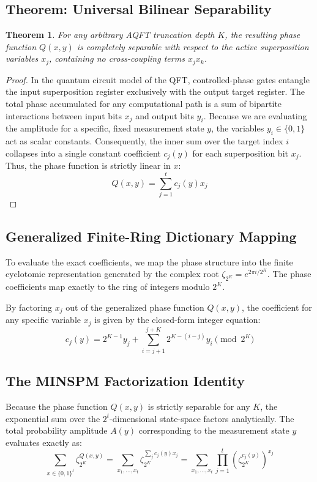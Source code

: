 \documentclass[11pt, a4paper]{article}
\newtheorem{theorem}{Theorem}
\begin{document}
\subsection{Theorem: Universal Bilinear Separability}
\begin{theorem}
For any arbitrary AQFT truncation depth $K$, the resulting phase function $Q(x,y)$ is completely separable with respect to the active superposition variables $x_j$, containing no cross-coupling terms $x_j x_k$.
\end{theorem}

\begin{proof}
In the quantum circuit model of the QFT, controlled-phase gates entangle the input superposition register exclusively with the output target register. The total phase accumulated for any computational path is a sum of bipartite interactions between input bits $x_j$ and output bits $y_i$. Because we are evaluating the amplitude for a specific, fixed measurement state $y$, the variables $y_i \in \{0,1\}$ act as scalar constants. Consequently, the inner sum over the target index $i$ collapses into a single constant coefficient $c_j(y)$ for each superposition bit $x_j$. Thus, the phase function is strictly linear in $x$:
\begin{equation}
Q(x,y) = \sum_{j=1}^t c_j(y) x_j
\end{equation}
\end{proof}

\subsection{Generalized Finite-Ring Dictionary Mapping}
To evaluate the exact coefficients, we map the phase structure into the finite cyclotomic representation generated by the complex root $\zeta_{2^K} = e^{2\pi i/2^K}$. The phase coefficients map exactly to the ring of integers modulo $2^K$. 

By factoring $x_j$ out of the generalized phase function $Q(x,y)$, the coefficient for any specific variable $x_j$ is given by the closed-form integer equation:
\begin{equation}
c_j(y) = 2^{K-1} y_j + \sum_{i=j+1}^{j+K} 2^{K-(i-j)} y_i \pmod{2^K}
\end{equation}

\subsection{The MINSPM Factorization Identity}
Because the phase function $Q(x,y)$ is strictly separable for any $K$, the exponential sum over the $2^t$-dimensional state-space factors analytically. The total probability amplitude $A(y)$ corresponding to the measurement state $y$ evaluates exactly as:
\begin{equation}
\sum_{x\in\{0,1\}^t} \zeta_{2^K}^{Q(x,y)} = \sum_{x_1,\dots,x_t} \zeta_{2^K}^{\sum_j c_j(y) x_j} = \sum_{x_1,\dots,x_t} \prod_{j=1}^t \left(\zeta_{2^K}^{c_j(y)}\right)^{x_j}
\end{equation}
\end{document}
